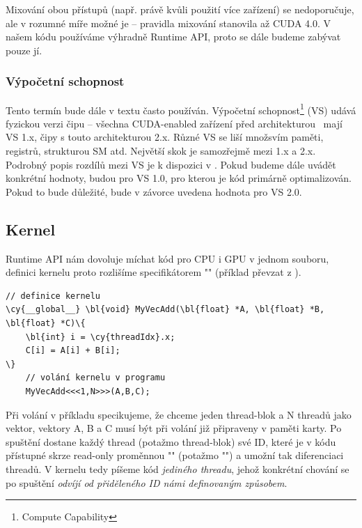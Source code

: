     Mixování obou přístupů (např. právě kvůli použití více zařízení) se nedoporučuje, ale v rozumné míře možné je -- pravidla mixování stanovila až CUDA 4.0. V našem kódu používáme výhradně Runtime API, proto se dále budeme zabývat pouze jí.

    \subsubsection{Výpočetní schopnost}

    Tento termín bude dále v textu často používán. Výpočetní schopnost\footnote{Compute Capability} (VS) udává fyzickou verzi čipu -- všechna CUDA-enabled zařízení před architekturou \FERMI ~mají VS 1.x, čipy s touto architekturou 2.x. Různé VS se liší množsvím paměti, registrů, strukturou SM atd. Největší skok je samozřejmě mezi 1.x a 2.x. Podrobný popis rozdílů mezi VS je k dispozici v \cite[přílohy]{CUDA programming g.}. Pokud budeme dále uvádět konkrétní hodnoty, budou pro VS 1.0, pro kterou je kód primárně optimalizován. Pokud to bude důležité, bude v závorce uvedena hodnota pro VS 2.0. 

    \subsection{Kernel}

    Runtime API nám dovoluje míchat kód pro CPU i GPU v jednom souboru, definici kernelu proto rozlišíme specifikátorem
    \Vr"" (příklad převzat z \cite{CUDA programming g.}).

    \begin{Verbatim}[commandchars = \\\{\}]
    // definice kernelu
\cy{__global__} \bl{void} MyVecAdd(\bl{float} *A, \bl{float} *B, \bl{float} *C)\{
    \bl{int} i = \cy{threadIdx}.x;
    C[i] = A[i] + B[i];
\}
    // volání kernelu v programu
    MyVecAdd<<<1,N>>>(A,B,C);
    \end{Verbatim}

    Při volání v příkladu specikujeme, že chceme jeden thread-blok a N threadů jako vektor, vektory A, B a C musí být při volání již připraveny v paměti karty. Po spuštění dostane každý thread (potažmo thread-blok) své ID, které je v kódu přístupné skrze read-only proměnnou \Vr"" (potažmo \Vr"") a umožní tak diferenciaci threadů. V kernelu tedy píšeme kód \emph{jediného threadu}, jehož konkrétní chování se po spuštění \emph{odvíjí od přiděleného ID námi definovaným způsobem}.

